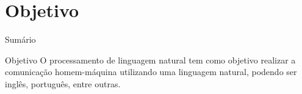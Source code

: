 \renewcommand{\titulo}{Objetivo}
\section{\titulo}

\begin{frame}{Sumário}
\tableofcontents[currentsection]
\end{frame}

\begin{frame}{\titulo}
O processamento de linguagem natural tem como objetivo realizar a comunicação homem-máquina utilizando uma linguagem natural, podendo ser inglês, português, entre outras.
\end{frame}


